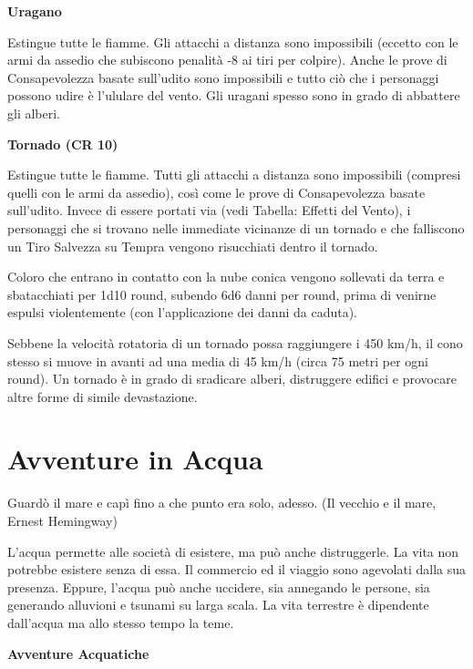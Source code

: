 \documentclass[a4paper,11pt,twoside,openany]{book}
\begin{document}
\textbf{Uragano}

Estingue tutte le fiamme. Gli attacchi a distanza sono impossibili (eccetto con le armi da assedio che subiscono penalità -8 ai tiri per colpire). Anche le prove di Consapevolezza basate sull'udito sono impossibili e tutto ciò che i personaggi possono udire è l'ululare del vento. Gli uragani spesso sono in grado di abbattere gli alberi.

\textbf{Tornado (CR 10)}

Estingue tutte le fiamme. Tutti gli attacchi a distanza sono impossibili (compresi quelli con le armi da assedio), così come le prove di Consapevolezza basate sull'udito. Invece di essere portati via (vedi Tabella: Effetti del Vento), i personaggi che si trovano nelle immediate vicinanze di un tornado e che falliscono un Tiro Salvezza su Tempra vengono risucchiati dentro il tornado.

Coloro che entrano in contatto con la nube conica vengono sollevati da terra e sbatacchiati per 1d10 round, subendo 6d6 danni per round, prima di venirne espulsi violentemente (con l'applicazione dei danni da caduta).

Sebbene la velocità rotatoria di un tornado possa raggiungere i 450 km/h, il cono stesso si muove in avanti ad una media di 45 km/h (circa 75 metri per ogni round). Un tornado è in grado di sradicare alberi, distruggere edifici e provocare altre forme di simile devastazione.

\pagebreak

\section{Avventure in Acqua}

\label{avventure-in-acqua}
\begin{tcolorbox}[enhanced,arc=5pt,boxrule=0.3pt]{Guardò il mare e capì fino a che punto era solo, adesso. (Il vecchio e il mare, Ernest Hemingway)}\end{tcolorbox}\medskip

L'acqua permette alle società di esistere, ma può anche distruggerle. La vita non potrebbe esistere senza di essa. Il commercio ed il viaggio sono agevolati dalla sua presenza. Eppure, l'acqua può anche uccidere, sia annegando le persone, sia generando alluvioni e tsunami su larga scala. La vita terrestre è dipendente dall'acqua ma allo stesso tempo la teme.

\textbf{Avventure Acquatiche}
\end{document}
